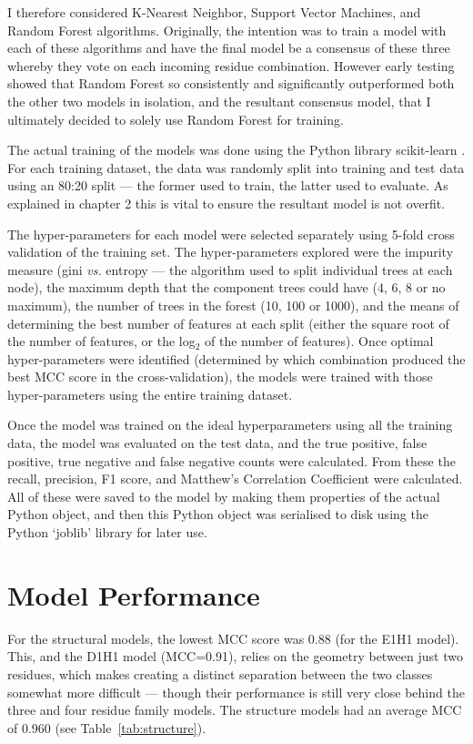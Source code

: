 I therefore considered K-Nearest Neighbor, Support Vector Machines, and Random Forest algorithms. Originally, the intention was to train a model with each of these algorithms and have the final model be a consensus of these three whereby they vote on each incoming residue combination. However early testing showed that Random Forest so consistently and significantly outperformed both the other two models in isolation, and the resultant consensus model, that I ultimately decided to solely use Random Forest for training.

The actual training of the models was done using the Python library scikit-learn \cite{scikit-learn}. For each training dataset, the data was randomly split into training and test data using an 80:20 split --- the former used to train, the latter used to evaluate. As explained in chapter 2 this is vital to ensure the resultant model is not overfit.

The hyper-parameters for each model were selected separately using 5-fold cross validation of the training set. The hyper-parameters explored were the impurity measure (gini \emph{vs.} entropy --- the algorithm used to split individual trees at each node), the maximum depth that the component trees could have (4, 6, 8 or no maximum), the number of trees in the forest (10, 100 or 1000), and the means of determining the best number of features at each split (either the
square root of the number of features, or the log$_2$ of the number of features). Once optimal hyper-parameters were identified (determined by which combination produced the best MCC score in the cross-validation), the models were trained with those hyper-parameters using the entire training dataset.

Once the model was trained on the ideal hyperparameters using all the training data, the model was evaluated on the test data, and the true positive, false positive, true negative and false negative counts were calculated. From these the recall, precision, F1 score, and Matthew's Correlation Coefficient were calculated. All of these were saved to the model by making them properties of the actual Python object, and then this Python object was serialised to disk using the Python `joblib' library for later use.

\section{Model Performance}

For the structural models, the lowest MCC score was 0.88 (for the E1H1 model). This, and the D1H1 model (MCC=0.91), relies on the geometry between just two residues, which makes creating a distinct separation between the two classes somewhat more difficult --- though their performance is still very close behind the three and four residue family models. The structure models had an average MCC of 0.960 (see Table~\ref{tab:structure}).

